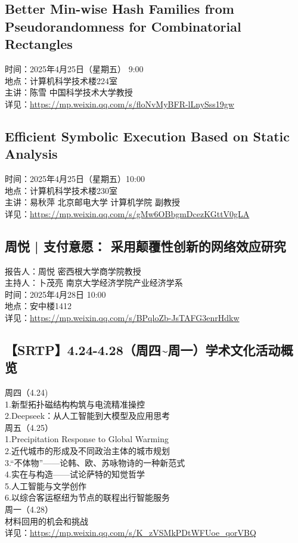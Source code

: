 \documentclass[letterpaper, 12pt]{article}
\begin{document}
\begin{multicols}{2}
\subsection{Better Min-wise Hash Families from Pseudorandomness for Combinatorial Rectangles} %
时间：2025年4月25日（星期五） 9:00
\\地点：计算机科学技术楼224室
\\主讲：陈雪 中国科学技术大学教授
\\详见：\url{https://mp.weixin.qq.com/s/floNvMyBFR-lLnySss19gw}

\subsection{Efficient Symbolic Execution Based on Static Analysis} %
时间：2025年4月25日（星期五）10:00
\\地点：计算机科学技术楼230室
\\主讲：易秋萍 北京邮电大学 计算机学院 副教授
\\详见：\url{https://mp.weixin.qq.com/s/gMw6OBbgmDcezKGttV0gLA}

\subsection{周悦 | 支付意愿： 采用颠覆性创新的网络效应研究} %
报告人：周悦 密西根大学商学院教授
\\主持人：卜茂亮 南京大学经济学院产业经济学系
\\时间：2025年4月28日 10:00 
\\地点：安中楼1412 
\\详见：\url{https://mp.weixin.qq.com/s/BPqloZb-JsTAFG3enrHdkw}

\subsection{【SRTP】4.24-4.28（周四\textasciitilde{}周一）学术文化活动概览} %
周四（4.24)
\\1.新型拓扑磁结构构筑与电流精准操控
\\2.Deepseek：从人工智能到大模型及应用思考
\\周五（4.25）
\\1.Precipitation Response to Global Warming
\\2.近代城市的形成及不同政治主体的城市规划
\\3.“不体物”——论韩、欧、苏咏物诗的一种新范式
\\4.实在与构造——试论萨特的知觉哲学
\\5.人工智能与文学创作
\\6.以综合客运枢纽为节点的联程出行智能服务
\\周一（4.28）
\\材料回用的机会和挑战
\\详见：\url{https://mp.weixin.qq.com/s/K_zVSMkPDtWFUoe_qorVBQ}

\end{multicols}
\end{document}
